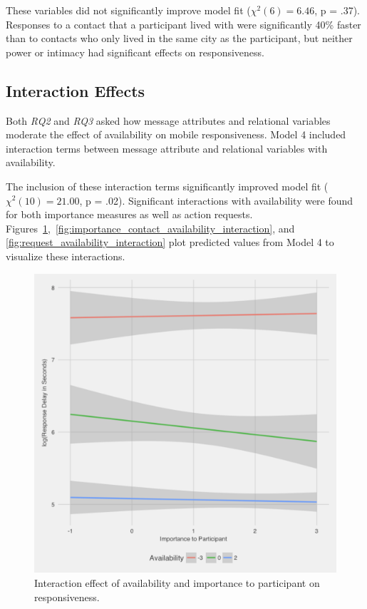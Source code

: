\documentclass[12pt]{nuthesis}	%
\begin{document}
These variables did not significantly improve model fit ($\chi^2(6) = 6.46$, p = .37). Responses to a contact that a participant lived with were significantly 40\% faster than to contacts who only lived in the same city as the participant, but neither power or intimacy had significant effects on responsiveness.

\subsection{Interaction Effects}

Both \textit{RQ2} and \textit{RQ3} asked how message attributes and relational variables moderate the effect of availability on mobile responsiveness. Model 4 included interaction terms between message attribute and relational variables with availability.

The inclusion of these interaction terms significantly improved model fit ($\chi^2(10) = 21.00$, p = .02). Significant interactions with availability were found for both importance measures as well as action requests. Figures~\ref{fig:importance_availability_interaction},~\ref{fig:importance_contact_availability_interaction}, and \ref{fig:request_availability_interaction} plot predicted values from Model 4 to visualize these interactions.

\begin{figure}[h]
\centering
\includegraphics[width=.7\textwidth]{figures/importance_availability_interaction}
\caption{Interaction effect of availability and importance to participant on responsiveness.}
\label{fig:importance_availability_interaction}
\end{figure}
\end{document}
